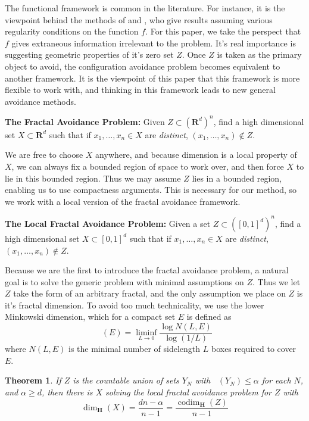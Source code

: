 \documentclass{article}
\theoremstyle{plain}
\theoremstyle{plain}
\newtheorem{theorem}{Theorem}
\DeclareMathOperator{\codim}{codim}
\DeclareMathOperator{\lhdim}{\underline{\dim}_{\mathbf{M}}}
\begin{document}
\begin{multicols}{2}
The functional framework is common in the literature. For instance, it is the viewpoint behind the methods of \cite{MalabikaRob} and \cite{Mathe}, who give results assuming various regularity conditions on the function $f$. For this paper, we take the perspect that $f$ gives extraneous information irrelevant to the problem. It's real importance is suggesting geometric properties of it's zero set $Z$. Once $Z$ is taken as the primary object to avoid, the configuration avoidance problem becomes equivalent to another framework. It is the viewpoint of this paper that this framework is more flexible to work with, and thinking in this framework leads to new general avoidance methods.

\begin{changemargin}{0.5em}{0em}
	{\bf The Fractal Avoidance Problem:} Given $Z \subset (\mathbf{R}^d)^n$, find a high dimensional set $X \subset \mathbf{R}^d$ such that if $x_1, \dots, x_n \in X$ are {\it distinct}, $(x_1, \dots, x_n) \not \in Z$.
\end{changemargin}

We are free to choose $X$ anywhere, and because dimension is a local property of $X$, we can always fix a bounded region of space to work over, and then force $X$ to lie in this bounded region. Thus we may assume $Z$ lies in a bounded region, enabling us to use compactness arguments. This is necessary for our method, so we work with a local version of the fractal avoidance framework.

\begin{changemargin}{0.5em}{0em}
	{\bf The Local Fractal Avoidance Problem:} Given a set $Z \subset ([0,1]^d)^n$, find a high dimensional set $X \subset [0,1]^d$ such that if $x_1, \dots, x_n \in X$ are {\it distinct}, $(x_1, \dots, x_n) \not \in Z$.
\end{changemargin}

Because we are the first to introduce the fractal avoidance problem, a natural goal is to solve the generic problem with minimal assumptions on $Z$. Thus we let $Z$ take the form of an arbitrary fractal, and the only assumption we place on $Z$ is it's fractal dimension. To avoid too much technicality, we use the lower Minkowski dimension, which for a compact set $E$ is defined as
%
\[ \lhdim(E) = \liminf_{L \to 0} \frac{\log N(L,E)}{\log(1/L)} \]
%
where $N(L,E)$ is the minimal number of sidelength $L$ boxes required to cover $E$.

\begin{theorem}
	If $Z$ is the countable union of sets $Y_N$ with $\lhdim(Y_N) \leq \alpha$ for each $N$, and $\alpha \geq d$, then there is $X$ solving the local fractal avoidance problem for $Z$ with
	\[ \dim_{\mathbf{H}}(X) = \frac{dn - \alpha}{n - 1} = \frac{\codim_{\mathbf{H}}(Z)}{n - 1} \]
\end{theorem}


\end{multicols}
\end{document}
